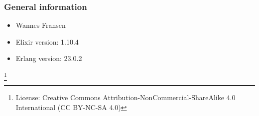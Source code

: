 \begin{frame}
    \frametitle{General information}
    \begin{center}
        \begin{itemize}
            \item Wannes Fransen
                  \vfill
            \item Elixir version: 1.10.4
            \item Erlang version: 23.0.2
        \end{itemize}
        \footnote{License: Creative Commons Attribution-NonCommercial-ShareAlike 4.0 International (CC BY-NC-SA 4.0)}
    \end{center}
\end{frame}